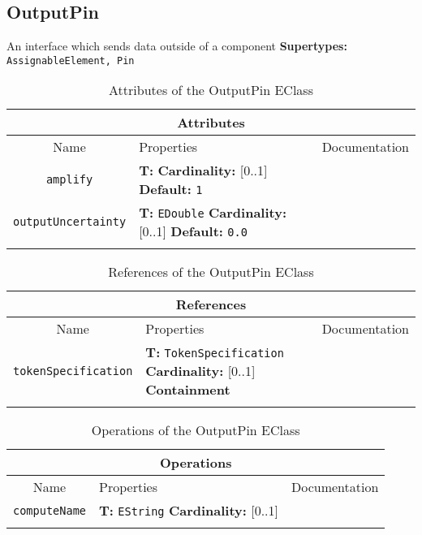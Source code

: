 \documentclass{article}
\begin{document}
\subsection[OutputPin]{OutputPin}
\label{e4smOutputPin}

An interface which sends data outside of a component
\textbf{Supertypes: }\texttt{AssignableElement, Pin}
\begin{table}[H]
\footnotesize
\begin{tabularx}{\textwidth}{|c| p{4 cm} | X |}
\hline
\multicolumn{3}{|c|}{\textbf{Attributes}} \\
\hline
Name & Properties & Documentation \\ \hline \hline
\texttt{amplify}
 & 
\textbf{T:} \texttt{}
\newline
\textbf{Cardinality:} [0..1]
\newline
\textbf{Default:} \texttt{1}
 & \\ \hline
\texttt{outputUncertainty}
 & 
\textbf{T:} \texttt{EDouble}
\newline
\textbf{Cardinality:} [0..1]
\newline
\textbf{Default:} \texttt{0.0}
 & \\ \hline
\caption{Attributes of the OutputPin EClass}
\end{tabularx}
\label{e4smOutputPinattr}
\end{table}
\begin{table}[H]
\footnotesize
\begin{tabularx}{\textwidth}{|c| p{4 cm} | X |}
\hline
\multicolumn{3}{|c|}{\textbf{References}} \\
\hline
Name & Properties & Documentation \\ \hline \hline
\texttt{tokenSpecification}
 & 
\textbf{T:} \texttt{TokenSpecification}
\newline
\textbf{Cardinality:} [0..1]
\newline
\textbf{Containment}
 & \\ \hline
\caption{References of the OutputPin EClass}
\end{tabularx}
\label{e4smOutputPinref}
\end{table}
\begin{table}[H]
\footnotesize
\begin{tabularx}{\textwidth}{|c| p{4 cm} | X |}
\hline
\multicolumn{3}{|c|}{\textbf{Operations}} \\
\hline
Name & Properties & Documentation \\ \hline \hline
\texttt{computeName}
 & 
\textbf{T:} \texttt{EString}
\newline
\textbf{Cardinality:} [0..1]
 & \\ \hline
\caption{Operations of the OutputPin EClass}
\end{tabularx}
\label{e4smOutputPinop}
\end{table}
\end{document}
